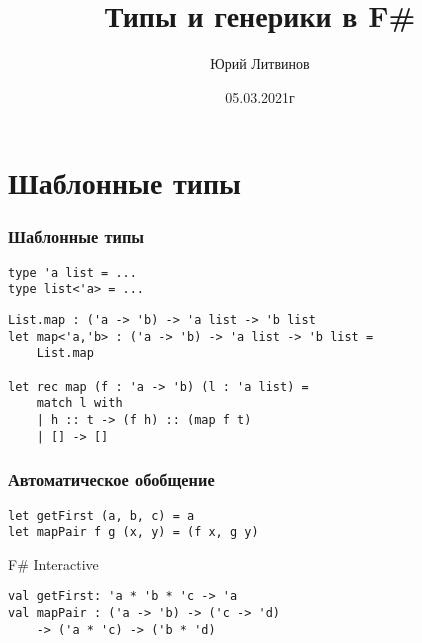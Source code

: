 \documentclass[xetex,mathserif,serif]{beamer}
\title{Типы и генерики в F\#}
\author{Юрий Литвинов}
\date{05.03.2021г}
\begin{document}
    \frame{\titlepage}

    \section{Шаблонные типы}
    
    \begin{frame}[fragile]
        \frametitle{Шаблонные типы}
        \begin{verbatim}
type 'a list = ...
type list<'a> = ...
        \end{verbatim}

        \begin{verbatim}
List.map : ('a -> 'b) -> 'a list -> 'b list
let map<'a,'b> : ('a -> 'b) -> 'a list -> 'b list = 
    List.map

let rec map (f : 'a -> 'b) (l : 'a list) =
    match l with
    | h :: t -> (f h) :: (map f t)
    | [] -> []
        \end{verbatim}
    \end{frame}

    \begin{frame}[fragile]
        \frametitle{Автоматическое обобщение}
        \begin{verbatim}
let getFirst (a, b, c) = a
let mapPair f g (x, y) = (f x, g y)
        \end{verbatim}

        \begin{alertblock}{F\# Interactive}
            \begin{verbatim}
val getFirst: 'a * 'b * 'c -> 'a
val mapPair : ('a -> 'b) -> ('c -> 'd) 
    -> ('a * 'c) -> ('b * 'd)
            \end{verbatim}
        \end{alertblock}
    \end{frame}
\end{document}
